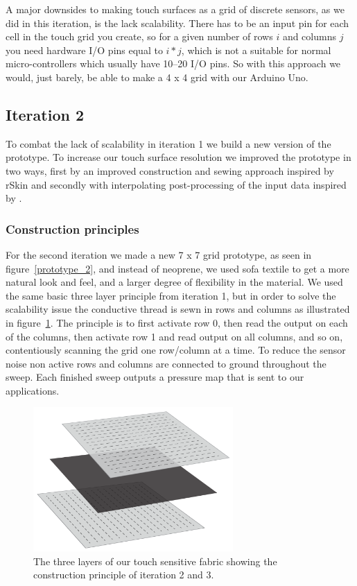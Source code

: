 A major downsides to making touch surfaces as a grid of discrete sensors, as we did in this iteration, is the lack scalability.
There has to be an input pin for each cell in the touch grid you create, so for a given number of rows \(i\) and columns \(j\) you need hardware I/O pins equal to \(i*j\), which is not a suitable for normal micro-controllers which usually have 10--20 I/O pins.
So with this approach we would, just barely, be able to make a 4 x 4 grid with our Arduino Uno. 

\subsection{Iteration 2}
\label{ch:textiletouch:it2}
To combat the lack of scalability in iteration 1 we build a new version of the prototype.
To increase our touch surface resolution we improved the prototype in two ways, first by an improved construction and sewing approach inspired by rSkin \citep{rSsininstructables,rskinplusea} and secondly with interpolating post-processing of the input data inspired by \citep{rosenberg2009unmousepad}. 

\subsubsection{Construction principles}
For the second iteration we made a new 7 x 7 grid prototype, as seen in figure~\ref{prototype_2}, and instead of neoprene, we used sofa textile to get a more natural look and feel, and a larger degree of flexibility in the material.
We used the same basic three layer principle from iteration 1, but in order to solve the scalability issue the conductive thread is sewn in rows and columns as illustrated in figure~\ref{layers_iteration2_and_3}.
The principle is to first activate row 0, then read the output on each of the columns, then activate row 1 and read output on all columns, and so on, contentiously scanning the grid one row/column at a time.
To reduce the sensor noise non active rows and columns are connected to ground throughout the sweep.
Each finished sweep outputs a pressure map that is sent to our applications.

\begin{figure}[h]
	\centering
  		\includegraphics[width=3in]{figures/touch/layers_it_23}
	\caption[The three layers of our touch sensitive fabric, iteration 2 and 3.]
   {The three layers of our touch sensitive fabric showing the construction principle of iteration 2 and 3.}
   \label{layers_iteration2_and_3}
\end{figure}


